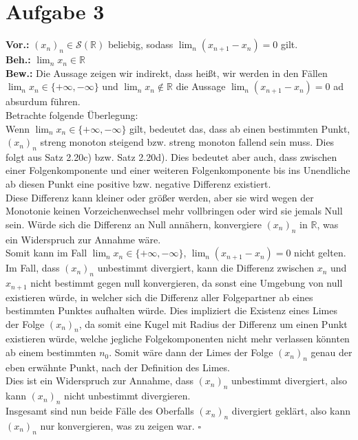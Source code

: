 \documentclass[12pt, a4paper]{article}
\newcommand*{\qed}{\null\nobreak\hfill\ensuremath{\square}}
\begin{document}
\section*{Aufgabe 3}
\textbf{Vor.:} \((x_n)_n \in \mathcal{S}(\mathbb{R})\) beliebig, sodass \(\lim_{n}(x_{n+1} - x_n ) = 0\) gilt. \\
\textbf{Beh.:} \(\lim_{n} x_n \in \mathbb{R}\) \\
\textbf{Bew.:} Die Aussage zeigen wir indirekt, dass heißt, wir werden in den Fällen \(\lim_n x_n \in \{+\infty, -\infty\}\) und \(\lim_n x_n \not\in \mathbb{R}\) die Aussage \(\lim_{n} (x_{n+1} - x_n) = 0\) ad absurdum führen. \\
Betrachte folgende Überlegung: \\
Wenn \(\lim_{n} x_n \in \{+\infty, -\infty\}\) gilt, bedeutet das, dass ab einen bestimmten Punkt, \((x_n)_n\) streng monoton steigend bzw. streng monoton fallend sein muss. Dies folgt aus Satz 2.20c) bzw. Satz 2.20d). Dies bedeutet aber auch, dass zwischen einer Folgenkomponente und einer weiteren Folgenkomponente bis ins Unendliche ab diesen Punkt eine positive bzw. negative Differenz existiert. \\
Diese Differenz kann kleiner oder größer werden, aber sie wird wegen der Monotonie keinen Vorzeichenwechsel mehr vollbringen oder wird sie jemals Null sein. Würde sich die Differenz an Null annähern, konvergiere \((x_n)_n\) in \(\mathbb R\), was ein Widerspruch zur Annahme wäre. \\
Somit kann im Fall \(\lim_{n} x_n \in \{+\infty, -\infty\}\), \(\lim_{n}(x_{n+1} - x_n ) = 0\) nicht gelten. \\
Im Fall, dass \((x_n)_n\) unbestimmt divergiert, kann die Differenz zwischen \(x_n\) und \(x_{n+1}\) nicht bestimmt gegen null konvergieren, da sonst eine Umgebung von null existieren würde, in welcher sich die Differenz aller Folgepartner ab eines bestimmten Punktes aufhalten würde. Dies impliziert die Existenz eines Limes der Folge \((x_n)_n\), da somit eine Kugel mit Radius der Differenz um einen Punkt existieren würde, welche jegliche Folgekomponenten nicht mehr verlassen könnten ab einem bestimmten \(n_0\). Somit wäre dann der Limes der Folge \((x_n)_n\) genau der eben erwähnte Punkt, nach der Definition des Limes. \\
Dies ist ein Widerspruch zur Annahme, dass \((x_n)_n\) unbestimmt divergiert, also kann \((x_n)_n\) nicht unbestimmt divergieren. \\
Insgesamt sind nun beide Fälle des Oberfalls \((x_n)_n\) divergiert geklärt, also kann \((x_n)_n\) nur konvergieren, was zu zeigen war. \qed
\end{document}
